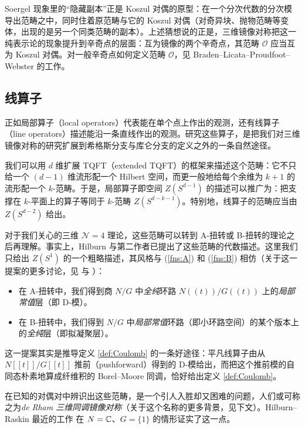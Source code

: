 \begin{yizhu}
Soergel 现象里的“隐藏副本”正是 Koszul 对偶的原型：在一个分次代数的分次模导出范畴之中，同时住着原范畴与它的 Koszul 对偶（对奇异块、抛物范畴等变体，出现的是另一个同类范畴的副本）。上述猜想说的正是，三维镜像对称把这一纯表示论的现象提升到辛奇点的层面：互为镜像的两个辛奇点，其范畴 $\mathcal{O}$ 应当互为 Koszul 对偶。对一般辛奇点如何定义范畴 $\mathcal{O}$，见 Braden–Licata–Proudfoot–Webster 的工作。
\end{yizhu}

\subsection{线算子}

正如局部算子（local operators）代表能在单个点上作出的观测，还有线算子（line operators）描述能沿一条直线作出的观测。研究这些算子，是把我们对三维镜像对称的研究扩展到希格斯分支与库仑分支的定义之外的一条自然途径。

我们可以用 $d$ 维扩展 TQFT（extended TQFT）的框架来描述这个范畴：它不只给一个 $(d-1)$ 维流形配一个 Hilbert 空间，而更一般地给每个余维为 $k+1$ 的流形配一个 $k$-范畴。于是，局部算子即空间 $Z(S^{d-1})$ 的描述可以推广为：把支撑在 $k$-平面上的算子等同于 $k$-范畴 $Z(S^{d-k-1})$。特别地，线算子的范畴应当由 $Z(S^{d-2})$ 给出。

对于我们关心的三维 $\mathcal{N}=4$ 理论，这些范畴可以转到 A-扭转或 B-扭转的理论之后再理解。事实上，Hilburn 与第二作者已提出了这些范畴的代数描述。这里我们只给出 $Z(S^1)$ 的一个粗略描述，其风格与 (\ref{fns:A}) 和 (\ref{fns:B}) 相仿（关于这一提案的更多讨论，见 \cite{bravermanCoulombBranches2018} 与 \cite{DGGH}）：
\begin{itemize}
	\item 在 A-扭转中，我们得到商 $N/G$ 中\emph{全纯}环路 $N((t))/G((t))$ 上的\emph{局部常值}层（即 D-模）。
	\item 在 B-扭转中，我们得到 $N/G$ 中\emph{局部常值}环路（即小环路空间）的某个版本上的\emph{全纯}层（即拟凝聚层）。
\end{itemize}
这一提案其实是推导定义 \ref{def:Coulomb} 的一条好途径：平凡线算子由从 $N[[t]]/G[[t]]$ 推前（pushforward）得到的 D-模给出，而把这个推前模的自同态朴素地算成纤维积的 Borel–Moore 同调，恰好给出定义 \ref{def:Coulomb}。

在已知的对偶对中辨识出这些范畴，是一个引人入胜却又困难的问题，人们或可称之为\emph{de Rham 三维同调镜像对称}（关于这个名称的更多背景，见下文）。Hilburn–Raskin 最近的工作 \cite{hilburnTateThesis2022} 在 $N=\mathbb{C}$、$G=\{1\}$ 的情形证实了这一点。

